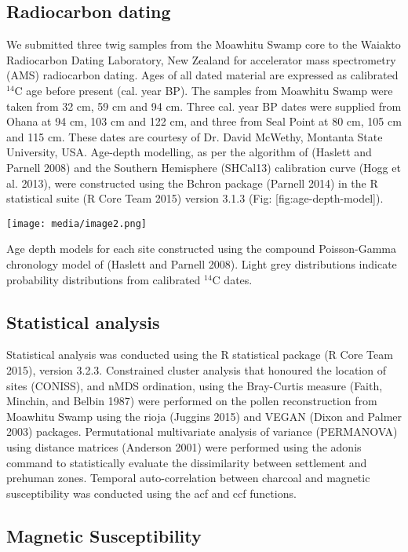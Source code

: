 \documentclass[]{article}
\begin{document}
\subsection{Radiocarbon dating}\label{radiocarbon-dating}

We submitted three twig samples from the Moawhitu Swamp core to the Waiakto Radiocarbon Dating Laboratory, New Zealand for accelerator mass spectrometry (AMS) radiocarbon dating. Ages of all dated material are expressed as calibrated \({}^{14}\)C age before present (cal. year BP). The samples from Moawhitu Swamp were taken from 32 cm, 59 cm and 94 cm. Three cal. year BP dates were supplied from Ohana at 94 cm, 103 cm and 122 cm, and three from Seal Point at 80 cm, 105 cm and 115 cm. These dates are courtesy of Dr. David McWethy, Montanta State University, USA. Age-depth modelling, as per the algorithm of (Haslett and Parnell 2008) and the Southern Hemisphere (SHCal13) calibration curve (Hogg et al. 2013), were constructed using the Bchron package (Parnell 2014) in the R statistical suite (R Core Team 2015) version 3.1.3 (Fig: {[}fig:age-depth-model{]}).

\texttt{[image: media/image2.png]}

Age depth models for each site constructed using the compound Poisson-Gamma chronology model of (Haslett and Parnell 2008). Light grey distributions indicate probability distributions from calibrated \({}^{14}\)C dates.

\subsection{Statistical analysis}\label{statistical-analysis}

Statistical analysis was conducted using the R statistical package (R Core Team 2015), version 3.2.3. Constrained cluster analysis that honoured the location of sites (CONISS), and nMDS ordination, using the Bray-Curtis measure (Faith, Minchin, and Belbin 1987) were performed on the pollen reconstruction from Moawhitu Swamp using the rioja (Juggins 2015) and VEGAN (Dixon and Palmer 2003) packages. Permutational multivariate analysis of variance (PERMANOVA) using distance matrices (Anderson 2001) were performed using the adonis command to statistically evaluate the dissimilarity between settlement and prehuman zones. Temporal auto-correlation between charcoal and magnetic susceptibility was conducted using the acf and ccf functions.

\subsection{Magnetic Susceptibility}\label{magnetic-susceptibility}
\end{document}
